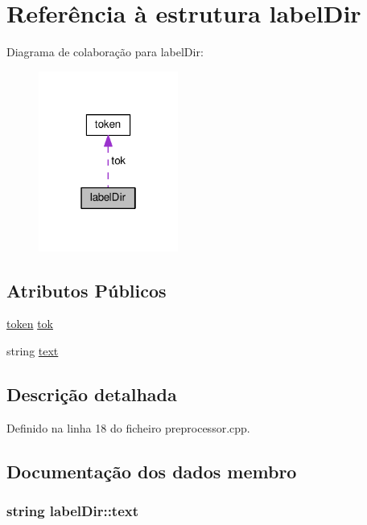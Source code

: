 \hypertarget{structlabel_dir}{\section{Referência à estrutura label\-Dir}
\label{structlabel_dir}
}


Diagrama de colaboração para label\-Dir\-:\nopagebreak
\begin{figure}[H]
\begin{center}
\leavevmode
\includegraphics[width=130pt]{structlabel_dir__coll__graph}
\end{center}
\end{figure}
\subsection*{Atributos Públicos}
\begin{DoxyCompactItemize}
\item 
\hyperlink{structtoken}{token} \hyperlink{structlabel_dir_a833846ebac6b8b7a0ee80a6083093e25}{tok}
\item 
string \hyperlink{structlabel_dir_ad9c433f36a95684cde33cf02833f8c02}{text}
\end{DoxyCompactItemize}


\subsection{Descrição detalhada}


Definido na linha 18 do ficheiro preprocessor.\-cpp.



\subsection{Documentação dos dados membro}
\hypertarget{structlabel_dir_ad9c433f36a95684cde33cf02833f8c02}{
\subsubsection[{text}]{\setlength{\rightskip}{0pt plus 5cm}string label\-Dir\-::text}}\label{structlabel_dir_ad9c433f36a95684cde33cf02833f8c02}


